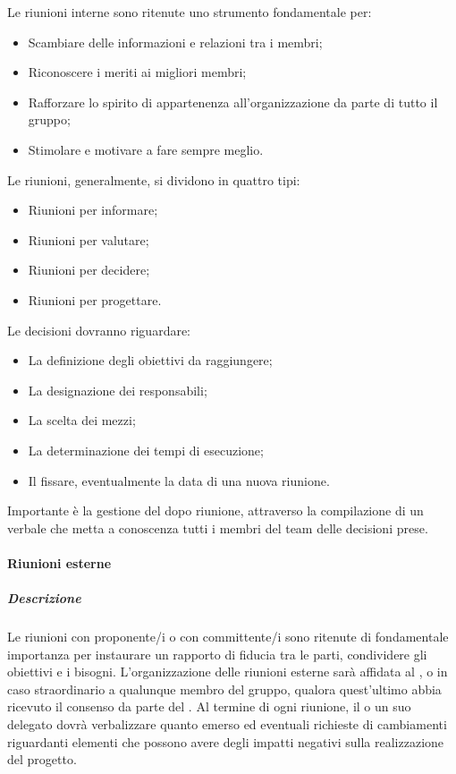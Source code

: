 Le riunioni interne sono ritenute uno strumento fondamentale per:
\begin{itemize}
\item
Scambiare delle informazioni e relazioni tra i membri;
\item
Riconoscere i meriti ai migliori membri;
\item
Rafforzare lo spirito di appartenenza all'organizzazione da parte di tutto il gruppo;
\item
Stimolare e motivare a fare sempre meglio.
\end{itemize}

Le riunioni, generalmente, si dividono in quattro tipi:
\begin{itemize}
\item
Riunioni per informare;
\item 
Riunioni per valutare;
\item
Riunioni per decidere;
\item 
Riunioni per progettare. 
\end{itemize}

Le decisioni dovranno riguardare:
\begin{itemize}
\item
La definizione degli obiettivi da raggiungere;
\item 
La designazione dei responsabili;
\item
La scelta dei mezzi;
\item
La determinazione dei tempi di esecuzione;
\item
Il fissare, eventualmente la data di una nuova riunione.
\end{itemize}

Importante è la gestione del dopo riunione, attraverso la compilazione di un verbale che metta a conoscenza tutti i membri del team delle decisioni prese.

\paragraph{Riunioni esterne}
\subparagraph{Descrizione}
Le riunioni con proponente/i o con committente/i sono ritenute di fondamentale importanza per instaurare un rapporto di fiducia tra le parti, condividere gli obiettivi e i bisogni.
L'organizzazione delle riunioni esterne sarà affidata al \textsl{\RdP}, o in caso straordinario a qualunque membro del gruppo, qualora quest'ultimo abbia ricevuto il consenso da parte del \textsl{\RdP}.
Al termine di ogni riunione, il \textsl{\RdP} o un suo delegato dovrà verbalizzare quanto emerso ed eventuali richieste di cambiamenti riguardanti elementi che possono avere degli impatti negativi sulla realizzazione del progetto.

